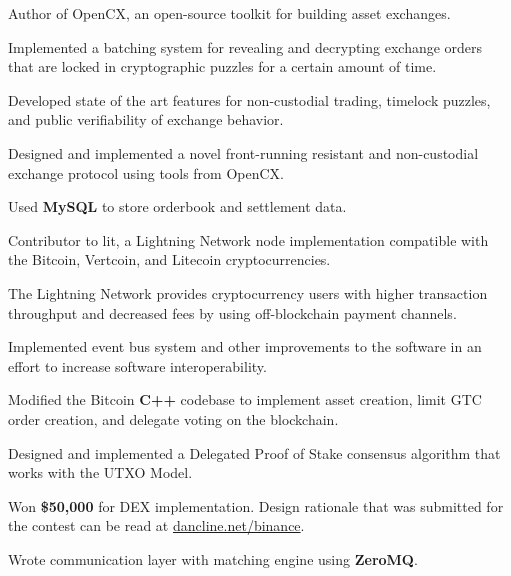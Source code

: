 
\begin{tightemize}
    \item Author of OpenCX, an open-source toolkit for building asset exchanges.
    \item Implemented a batching system for revealing and decrypting exchange
        orders that are locked in cryptographic puzzles for a certain amount of
        time.
    \item Developed state of the art features for non-custodial trading,
        timelock puzzles, and public verifiability of exchange behavior.
    \item Designed and implemented a novel front-running resistant and
        non-custodial exchange protocol using tools from OpenCX.
    \item Used \textbf{MySQL} to store orderbook and settlement data.
\end{tightemize}
\subsectionsep

\begin{tightemize}
  \item Contributor to lit, a Lightning Network node implementation compatible
      with the Bitcoin, Vertcoin, and Litecoin cryptocurrencies.
  \item The Lightning Network provides cryptocurrency users with higher
      transaction throughput and decreased fees by using off-blockchain payment
      channels.
  \item Implemented event bus system and other improvements to the software in
      an effort to increase software interoperability.
\end{tightemize}
\subsectionsep

\begin{tightemize}
    \item Modified the Bitcoin \textbf{C++} codebase to implement asset
        creation, limit GTC order creation, and delegate voting on the
        blockchain.
    \item Designed and implemented a Delegated Proof of
        Stake consensus algorithm that works with the UTXO Model.
    \item Won \textbf{\$50,000} for DEX implementation.  Design rationale that
        was submitted for the contest can be read at
        \href{https://dancline.net/binance/}{dancline.net/binance}.
    \item Wrote communication layer with matching engine using \textbf{ZeroMQ}.
\end{tightemize}
